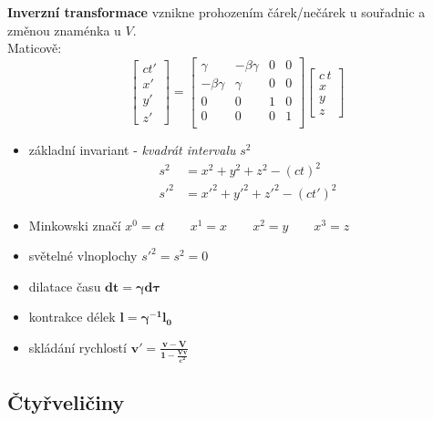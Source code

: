 \documentclass[a5paper,12pt]{article}
\begin{document}
\textbf{Inverzní transformace} vznikne prohozením čárek/nečárek u souřadnic a změnou znaménka u $V$.\\

\noindent Maticově:
\begin{equation*}
	\begin{bmatrix}c t' \\ x' \\ y' \\ z'\end{bmatrix}
	=
	\begin{bmatrix}\gamma&-\beta \gamma&0&0\\-\beta \gamma&\gamma&0&0\\0&0&1&0\\0&0&0&1\\\end{bmatrix}
	\begin{bmatrix}c\,t \\ x \\ y \\ z\end{bmatrix}
\end{equation*}

\begin{itemize}
	\item základní invariant - \textit{kvadrát intervalu} $s^2$
	\begin{align*}
	s^2 &= x^2 + y^2 + z^2 - (ct)^2\\
	s'^2 &= x'^2 + y'^2 + z'^2 - (ct')^2
	\end{align*}

	\item Minkowski značí $x^0 = ct \qquad x^1 = x \qquad x^2 = y \qquad x^3 = z$
	
	\item světelné vlnoplochy $s'^2 = s^2 = 0$
	
	\item dilatace času $\boldsymbol{dt = \gamma d\tau}$
	
	\item kontrakce délek $\boldsymbol{l = \gamma{}^{-1} l_0}$
	
	\item skládání rychlostí $\boldsymbol{v' = \frac{v - V}{1 - \frac{Vv}{c^2}}}$
	
\end{itemize}

\subsection{Čtyřveličiny}
\end{document}
